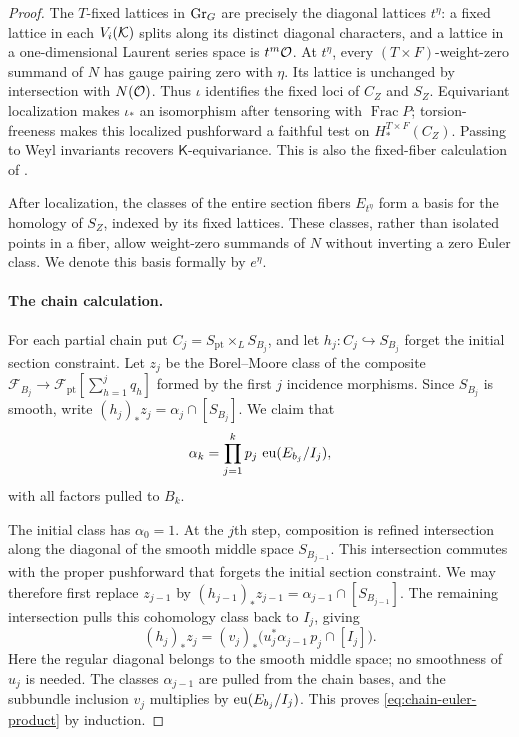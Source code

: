 \begin{proof}
The $T$-fixed lattices in $\operatorname{Gr}_G$ are precisely the diagonal lattices
$t^\eta$: a fixed lattice in each $V_i(\mathcal K)$ splits along its distinct
diagonal characters, and a lattice in a one-dimensional Laurent series
space is $t^m\mathcal O$.  At $t^\eta$, every $(T\times F)$-weight-zero
summand of $N$ has gauge pairing zero with $\eta$.  Its lattice is
unchanged by intersection with $N(\mathcal O)$.  Thus $\iota$ identifies the
fixed loci of $C_Z$ and $S_Z$.  Equivariant localization makes
$\iota_*$ an isomorphism after tensoring with $\operatorname{Frac}P$;
torsion-freeness makes this localized pushforward a faithful test on
$H_*^{T\times F}(C_Z)$.  Passing to Weyl invariants recovers
$\mathsf K$-equivariance.  This is also the fixed-fiber calculation of
\cite[Lemma~5.13]{BFN18}.

After localization, the classes of the entire section fibers
$E_{t^\eta}$ form a basis for the homology of $S_Z$, indexed by its
fixed lattices.  These classes, rather than isolated points in a fiber,
allow weight-zero summands of $N$ without inverting a zero Euler class.
We denote this basis formally by $e^\eta$.

\paragraph{The chain calculation.}
For each partial chain put $C_j=S_{\mathrm{pt}}\times_LS_{B_j}$, and let
$h_j:C_j\hookrightarrow S_{B_j}$ forget the initial section constraint.
Let $z_j$ be the Borel--Moore class of the composite
$\mathcal F_{B_j}\to\mathcal F_{\mathrm{pt}}[\sum_{h=1}^j q_h]$
formed by the first $j$ incidence morphisms.  Since $S_{B_j}$ is smooth, write
$(h_j)_*z_j=\alpha_j\cap[S_{B_j}]$.  We claim that
\begin{equation}
 \label{eq:chain-euler-product}
 \alpha_k=\prod_{j=1}^k p_j\,\operatorname{eu}(E_{b_j}/I_j),
\end{equation}
with all factors pulled to $B_k$.

The initial class has $\alpha_0=1$.  At the $j$th step, composition is
refined intersection along the diagonal of the smooth middle space
$S_{B_{j-1}}$.  This intersection commutes with the proper pushforward
that forgets the initial section constraint.  We may therefore first
replace $z_{j-1}$ by $(h_{j-1})_*z_{j-1}
=\alpha_{j-1}\cap[S_{B_{j-1}}]$.  The remaining intersection pulls this
cohomology class back to $I_j$, giving
\[
 (h_j)_*z_j
 =(v_j)_*\bigl(u_j^*\alpha_{j-1}\,p_j\cap[I_j]\bigr).
\]
Here the regular diagonal belongs to the smooth middle space; no
smoothness of $u_j$ is needed.  The classes $\alpha_{j-1}$ are pulled
from the chain bases, and the subbundle inclusion $v_j$ multiplies by
$\operatorname{eu}(E_{b_j}/I_j)$.  This proves \eqref{eq:chain-euler-product} by
induction.


\end{proof}
